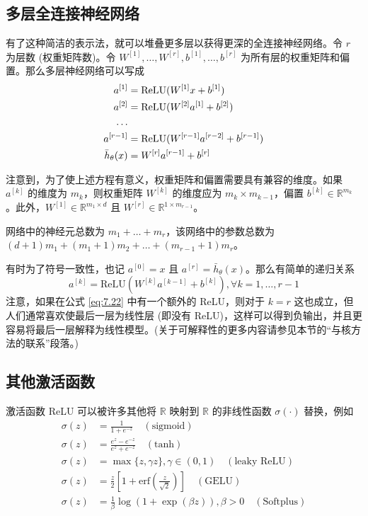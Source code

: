 \subsection*{多层全连接神经网络}

有了这种简洁的表示法，就可以堆叠更多层以获得更深的全连接神经网络。令 $r$ 为层数 (权重矩阵数)。令 $W^{[1]}, \dots, W^{[r]}, b^{[1]}, \dots, b^{[r]}$ 为所有层的权重矩阵和偏置。那么多层神经网络可以写成
\begin{align}
    a^{[1]} &= \text{ReLU}(W^{[1]} x + b^{[1]}) \notag\\
    a^{[2]} &= \text{ReLU}(W^{[2]} a^{[1]} + b^{[2]}) \notag\\
    \dots \notag\\
    a^{[r-1]} &= \text{ReLU}(W^{[r-1]} a^{[r-2]} + b^{[r-1]}) \notag\\
    \bar{h}_\theta(x) &= W^{[r]} a^{[r-1]} + b^{[r]}
    \label{eq:7.22}
\end{align}

注意到，为了使上述方程有意义，权重矩阵和偏置需要具有兼容的维度。如果 $a^{[k]}$ 的维度为 $m_k$，则权重矩阵 $W^{[k]}$ 的维度应为 $m_k \times m_{k-1}$，偏置 $b^{[k]} \in \mathbb{R}^{m_k}$。此外，$W^{[1]} \in \mathbb{R}^{m_1 \times d}$ 且 $W^{[r]} \in \mathbb{R}^{1 \times m_{r-1}}$。

网络中的神经元总数为 $m_1 + \dots + m_r$，该网络中的参数总数为 $(d+1)m_1 + (m_1+1)m_2 + \dots + (m_{r-1}+1)m_r$。

有时为了符号一致性，也记 $a^{[0]} = x$ 且 $a^{[r]} = \bar{h}_\theta(x)$。那么有简单的递归关系
\begin{equation}
    a^{[k]} = \text{ReLU}(W^{[k]} a^{[k-1]} + b^{[k]}), \forall k = 1, \dots, r-1
    \label{eq:7.23}
\end{equation}
注意，如果在公式 \eqref{eq:7.22} 中有一个额外的 ReLU，则对于 $k=r$ 这也成立，但人们通常喜欢使最后一层为线性层 (即没有 ReLU)，这样可以得到负输出，并且更容易将最后一层解释为线性模型。(关于可解释性的更多内容请参见本节的“与核方法的联系”段落。)

\subsection*{其他激活函数}

激活函数 ReLU 可以被许多其他将 $\mathbb{R}$ 映射到 $\mathbb{R}$ 的非线性函数 $\sigma(\cdot)$ 替换，例如
\begin{align}
    \sigma(z) &= \frac{1}{1 + e^{-z}} \quad (\text{sigmoid}) \label{eq:7.24} \\
    \sigma(z) &= \frac{e^z - e^{-z}}{e^z + e^{-z}} \quad (\text{tanh}) \label{eq:7.25} \\
    \sigma(z) &= \max\{z, \gamma z\}, \gamma \in (0, 1) \quad (\text{leaky ReLU}) \label{eq:7.26} \\
    \sigma(z) &= \frac{z}{2} \left[1 + \text{erf}\left(\frac{z}{\sqrt{2}}\right)\right] \quad (\text{GELU}) \label{eq:7.27} \\
    \sigma(z) &= \frac{1}{\beta} \log(1 + \exp(\beta z)), \beta > 0 \quad (\text{Softplus}) \label{eq:7.28}
\end{align}

